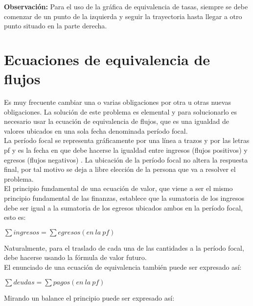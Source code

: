 \textbf{Observación:} Para el uso de la gráfica de equivalencia de tasas, siempre se debe comenzar de un punto de la izquierda y seguir la trayectoria hasta llegar a otro punto situado en la parte derecha.\\
\newpage








\section{Ecuaciones de equivalencia de flujos}
Es muy frecuente cambiar una o varias obligaciones por otra u otras nuevas obligaciones. La solución de este problema es elemental y para solucionarlo es necesario usar la ecuación de equivalencia de flujos, que es una igualdad de valores ubicados en una sola fecha denominada período focal.\\
La período focal se representa gráficamente por una línea a trazos y por las letras pf y es la fecha en que debe hacerse la igualdad entre ingresos (flujos positivos) y egresos (flujos negativos) . La ubicación de la período focal no altera la respuesta final, por tal motivo se deja a libre elección de la persona que va a resolver el problema.\\
El principio fundamental de una ecuación de valor, que viene a ser el mismo principio fundamental de las finanzas, establece que la sumatoria de los ingresos debe ser igual a la sumatoria de los egresos ubicados ambos en la período focal, esto es:

\begin{center}
   $\sum ingresos = \sum egresos(en\ la\ pf)$\\
\end{center}
Naturalmente, para el traslado de cada una de las cantidades a la período focal, debe hacerse usando la fórmula de valor futuro.\\
El enunciado de una ecuación de equivalencia también puede ser expresado así:

\begin{center}
   $\sum deudas = \sum pagos(en\ la\ pf)$\\
\end{center}

Mirando un balance el principio puede ser expresado así:\\

